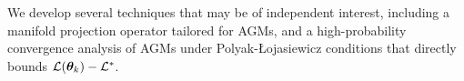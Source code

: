 \begin{enumerate}
    We develop several techniques that may be of independent interest, including a manifold projection operator tailored for AGMs, and a high-probability convergence analysis of AGMs under Polyak-Łojasiewicz conditions that directly bounds $\mathcal{L}({\bm{\theta}}_k)-\mathcal{L}^*$.
\end{enumerate}






